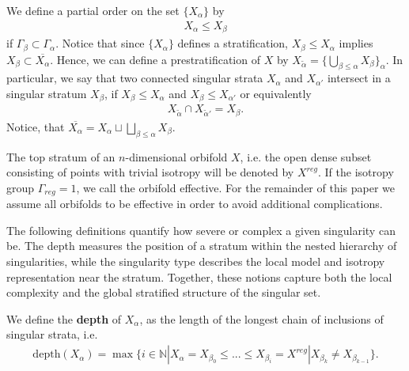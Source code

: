 \documentclass[psamsfonts]{amsart}
\theoremstyle{plain}
\theoremstyle{definition}{
\newtheorem{defi}{Definition}[section]
\newtheorem{ass}{Assumption}
\newtheorem*{nota}{Notation}}
\theoremstyle{remark}{
\newtheorem{rem}{Remark}
\newtheorem{ex}{Example}}
\theoremstyle{plain}{
\newtheorem{thm}{Theorem}[section]
\newtheorem{lem}{Lemma}[section]
\newtheorem{cor}{Corollary}[section]
\newtheorem{prop}{Proposition}[section]
\newtheorem{con}{Conjecture}[section]}
\newcommand{\m}[1]{{\mathrm{#1}}}
\begin{document}
We define a partial order on the set $\{X_\alpha\}$ by 
\begin{align*}
    X_\alpha\leq  X_\beta
\end{align*}
if $ \Gamma_\beta\subset  \Gamma_\alpha$. Notice that since  $\{X_\alpha\}$ defines a stratification, $X_\beta\leq X_\alpha$ implies $X_\beta\subset \overline{X_\alpha}$. Hence, we can define a prestratification of $X$ by $X_{\tilde{\alpha}}=\{\bigcup_{\beta\leq\alpha}X_\beta\}_\alpha$. In particular, we say that two connected singular strata $X_\alpha$ and $X_{\alpha'}$ intersect in a singular stratum $X_\beta$, if $X_\beta\leq X_\alpha$ and $X_\beta\leq X_{\alpha'}$ or equivalently 
\begin{align*}
    X_{\tilde{\alpha}}\cap X_{\tilde{\alpha}'}=X_{\beta}.
\end{align*}
Notice, that $\overline{X_\alpha}=X_\alpha\sqcup \bigsqcup_{\beta\leq\alpha}X_\beta$. 

\begin{rem}
    The top stratum of an $n$-dimensional orbifold $X$, i.e. the open dense subset consisting of points with trivial isotropy will be denoted by $X^{reg}$. If the isotropy group $\Gamma_{reg} = 1$, we call the orbifold effective. For the remainder of this paper we assume all orbifolds to be effective in order to avoid additional complications.
\end{rem}

The following definitions quantify how severe or complex a given singularity can be. The depth measures the position of a stratum within the nested hierarchy of singularities, while the singularity type describes the local model and isotropy representation near the stratum. Together, these notions capture both the local complexity and the global stratified structure of the singular set.

\begin{defi}
    We define the \textbf{depth} of $X_{\alpha}$, as the length of the longest chain of inclusions of singular strata, i.e. 
    \begin{align*}
        \m{depth}(X_\alpha)=\max\{i\in \mathbb{N}|X_{\alpha}= X_{\beta_0}\leq...\leq X_{\beta_i}= X^{reg}|X_{\beta_k}\neq X_{\beta_{k-1}}\}.
    \end{align*}
\end{defi}
\end{document}
